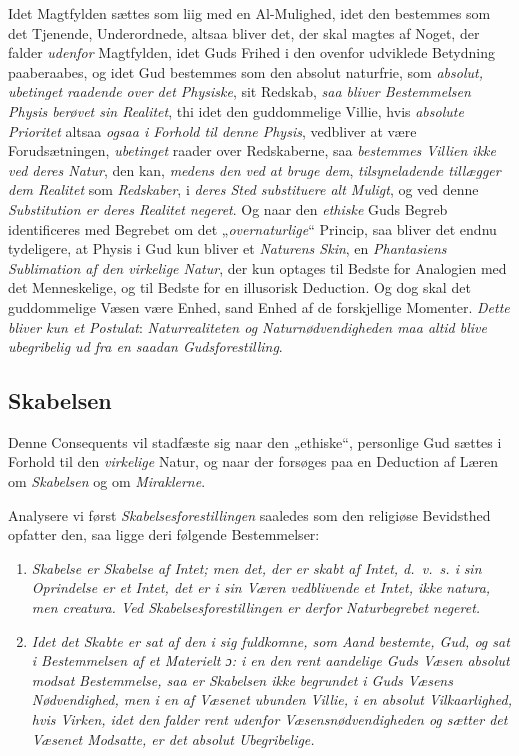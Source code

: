 \documentclass[12pt,a4paper]{book}
\newcommand{\opage}[1]{\marginnote{\footnotesize\textit{[#1]}}}
\begin{document}
Idet Magtfylden sættes som liig med en Al-Mulighed, idet den bestemmes som det
Tjenende, Underordnede, altsaa bliver det, der skal magtes af Noget, der falder \emph{udenfor} Magtfylden, idet Guds Frihed i den ovenfor udviklede Betydning paaberaabes,
og idet Gud bestemmes som den absolut naturfrie, som \emph{absolut, ubetinget raadende over det Physiske}, sit Redskab, \emph{saa bliver Bestemmelsen Physis berøvet sin Realitet}, thi idet den guddommelige Villie, hvis \emph{absolute Prioritet} altsaa \emph{ogsaa i Forhold til denne Physis}, vedbliver at være Forudsætningen, \emph{ubetinget} raader over
Redskaberne, saa \emph{bestemmes Villien ikke ved deres Natur}, den kan, \emph{medens den ved at bruge dem}, \emph{tilsyneladende tillægger dem Realitet} som \emph{Redskaber}, i \emph{deres Sted substituere alt Muligt}, og ved denne \emph{Substitution er deres Realitet negeret}. Og naar
den \emph{ethiske} Guds Begreb identificeres med Begrebet om det „\emph{overnaturlige}“ Princip,
saa bliver det endnu tydeligere, at Phy\opage{75}sis i Gud kun bliver et \emph{Naturens Skin}, en \emph{Phantasiens Sublimation af den virkelige Natur}, der kun optages til Bedste for
Analogien med det Menneskelige, og til Bedste for en illusorisk Deduction. Og dog
skal det guddommelige Væsen være Enhed, sand Enhed af de forskjellige Momenter.
\emph{Dette bliver kun et Postulat}: \emph{Naturrealiteten og Naturnødvendigheden maa altid blive ubegribelig ud fra en saadan Gudsforestilling}.

\subsection{Skabelsen}
\label{ssec:skabelsen}

Denne Consequents vil stadfæste sig naar den „ethiske“, personlige Gud sættes i
Forhold til den \emph{virkelige} Natur, og naar der forsøges paa en Deduction af Læren om
\emph{Skabelsen} og om \emph{Miraklerne}.

Analysere vi først \emph{Skabelsesforestillingen} saaledes som den religiøse Bevidsthed
opfatter den, saa ligge deri følgende Bestemmelser:

\begin{enumerate}[label=\arabic*)]
\item \emph{Skabelse er Skabelse af Intet; men det, der er skabt af Intet, d.\ v.\ s. i}
  \emph{sin Oprindelse er et Intet, det er i sin Væren vedblivende et Intet, ikke}
  \emph{\textit{natura}, men \textit{creatura}. Ved Skabelsesforestillingen er derfor}
  \emph{Naturbegrebet negeret.}
\item \emph{Idet det Skabte er sat af den i sig fuldkomne, som Aand bestemte, Gud, og sat}
  \emph{i Bestemmelsen af et Materielt ɔ: i en den rent aandelige Guds Væsen absolut modsat}
  \emph{Bestemmelse, saa er Skabelsen ikke begrundet i Guds Væsens Nødvendighed, men i en}
  \emph{af Væsenet ubunden Villie, i en absolut Vilkaarlighed, hvis Virken, idet den}
  \emph{falder rent udenfor Væsensnødvendigheden og sætter det Væsenet Modsatte, er det}
  \emph{absolut Ubegribelige.}
\end{enumerate}
\end{document}
